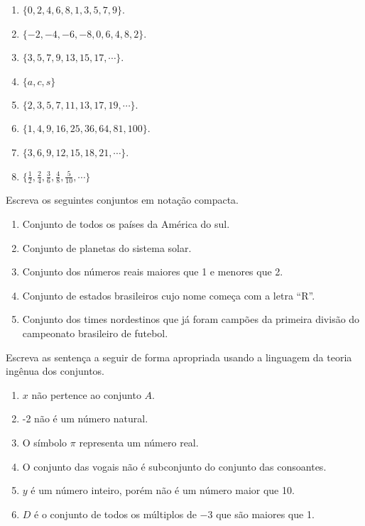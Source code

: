 \begin{enumerate}
	\item $\{0,2,4,6,8,1,3,5,7,9\}$.
	\item $\{-2, -4, -6, -8, 0, 6, 4, 8, 2\}$.
	\item $\{3, 5, 7, 9, 13, 15, 17, \cdots\}$.
	\item $\{a, c, s\}$
	\item $\{2, 3, 5, 7, 11, 13, 17, 19, \cdots\}$.
	\item $\{1, 4, 9, 16, 25, 36, 64, 81, 100\}$.
	\item $\{3, 6, 9, 12, 15, 18, 21, \cdots\}$.
	\item $\{\frac{1}{2}, \frac{2}{4}, \frac{3}{6}, \frac{4}{8}, \frac{5}{10}, \cdots\}$
\end{enumerate}

\begin{exercise}\label{exerc:Conjuntos1}
	Escreva os seguintes conjuntos em notação compacta.
\end{exercise}

\begin{enumerate}
	\item Conjunto de todos os países da América do sul.
	\item Conjunto de planetas do sistema solar.
	\item Conjunto dos números reais maiores que 1 e menores que 2.
	\item Conjunto de estados brasileiros cujo nome começa com a letra ``R''.
	\item Conjunto dos times nordestinos que já foram campões da primeira divisão do campeonato brasileiro de futebol.
\end{enumerate}

\begin{exercise}\label{exerc:Conjuntos2}
	Escreva as sentença a seguir de forma apropriada usando a linguagem da teoria ingênua dos conjuntos.
\end{exercise}

\begin{enumerate}
	\item $x$ não pertence ao conjunto $A$.
	\item -2 não é um número natural.
	\item O símbolo $\pi$ representa um número real.
	\item O conjunto das vogais não é subconjunto do conjunto das consoantes. 
	\item $y$ é um número inteiro, porém não é um número maior que 10.
	\item $D$ é o conjunto de todos os múltiplos de $-3$ que são maiores que 1.
\end{enumerate}

